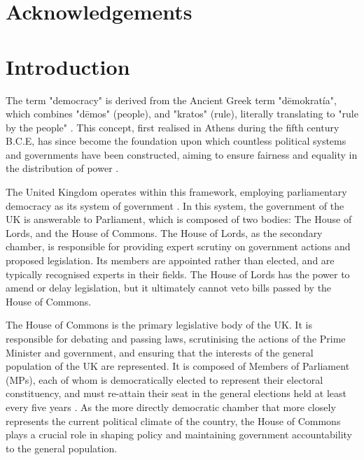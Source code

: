 \documentclass{article}
\begin{document}
\newpage

\section*{Acknowledgements}

\newpage

\tableofcontents

\newpage

\section{Introduction}
The term "democracy" is derived from the Ancient Greek term "dēmokratía", which combines "dēmos" (people), and "kratos" (rule), 
literally translating to "rule by the people" \cite{democracy}. This concept, first realised in Athens during the fifth century B.C.E, has since become the
foundation upon which countless political systems and governments have been constructed, aiming to ensure fairness and equality in the distribution of power \cite{natgeo}.

The United Kingdom operates within this framework, employing parliamentary democracy as its system of government \cite{parldem}. In this system, the government of
the UK is answerable to Parliament, which is composed of two bodies: The House of Lords, and the House of Commons. The House of Lords, as the secondary chamber,
is responsible for providing expert scrutiny on government actions and proposed legislation. Its members are appointed rather than elected, and are typically 
recognised experts in their fields. The House of Lords has the power to amend or delay legislation, but it ultimately cannot veto bills passed by the House of 
Commons.

The House of Commons is the primary legislative body of the UK. It is responsible for debating and passing laws, scrutinising the actions of the Prime Minister
and government, and ensuring that the interests of the general population of the UK are represented. It is composed of Members of Parliament (MPs), each of
whom is democratically elected to represent their electoral constituency, and must re-attain their seat in the general elections held at least every five
years \cite{generalelections}. As the more directly democratic chamber that more closely represents the current political climate of the country, the House of Commons plays a crucial
role in shaping policy and maintaining government accountability to the general population. 
\end{document}
